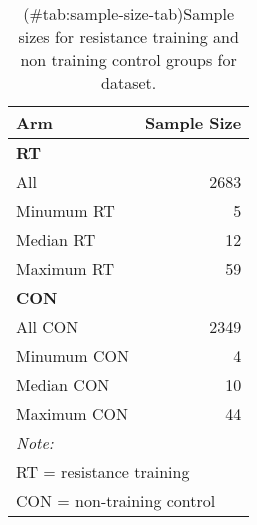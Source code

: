 \documentclass[
]{article}
\begin{document}
\begin{table}

\caption{(\#tab:sample-size-tab)Sample sizes for resistance training and non training control groups for dataset.}
\centering
\begin{tabular}[t]{l|r}
\hline
\textbf{Arm} & \textbf{Sample Size}\\
\hline
\multicolumn{2}{l}{\textbf{RT}}\\
\hline
\hspace{1em}All & 2683\\
\hline
\hspace{1em}Minumum RT & 5\\
\hline
\hspace{1em}Median RT & 12\\
\hline
\hspace{1em}Maximum RT & 59\\
\hline
\multicolumn{2}{l}{\textbf{CON}}\\
\hline
\hspace{1em}All CON & 2349\\
\hline
\hspace{1em}Minumum CON & 4\\
\hline
\hspace{1em}Median CON & 10\\
\hline
\hspace{1em}Maximum CON & 44\\
\hline
\multicolumn{2}{l}{\rule{0pt}{1em}\textit{Note: }}\\
\multicolumn{2}{l}{\rule{0pt}{1em}RT = resistance training}\\
\multicolumn{2}{l}{\rule{0pt}{1em}CON = non-training control}\\
\end{tabular}
\end{table}
\end{document}
